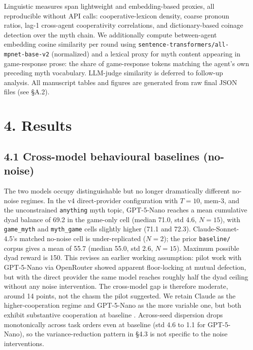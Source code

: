 \documentclass[10pt,letterpaper]{article}
\begin{document}
Linguistic measures span lightweight and embedding-based proxies, all
reproducible without API calls: cooperative-lexicon density, coarse
pronoun ratios, lag-1 cross-agent cooperativity correlations, and
dictionary-based coinage detection over the myth chain. We additionally
compute between-agent embedding cosine similarity per round using
\texttt{sentence-transformers/all-mpnet-base-v2} (normalized) and a
lexical proxy for myth content appearing in game-response prose: the
share of game-response tokens matching the agent's own preceding myth
vocabulary. LLM-judge similarity is deferred to follow-up analysis. All
manuscript tables and figures are generated from raw final JSON files
(see §A.2).

\section{4. Results}\label{results}

\subsection{4.1 Cross-model behavioural baselines
(no-noise)}\label{cross-model-behavioural-baselines-no-noise}

The two models occupy distinguishable but no longer dramatically
different no-noise regimes. In the v4 direct-provider configuration with
\(T = 10\), mem-3, and the unconstrained \texttt{anything} myth topic,
GPT-5-Nano reaches a mean cumulative dyad balance of 69.2 in the
game-only cell (median 71.0, std 4.6, \(N=15\)), with
\texttt{game\_myth} and \texttt{myth\_game} cells slightly higher (71.1
and 72.3). Claude-Sonnet-4.5's matched no-noise cell is under-replicated
(\(N = 2\)); the prior \texttt{baseline/} corpus gives a mean of 55.7
(median 55.0, std 2.6, \(N = 15\)). Maximum possible dyad reward is 150.
This revises an earlier working assumption: pilot work with GPT-5-Nano
via OpenRouter showed apparent floor-locking at mutual defection, but
with the direct provider the same model reaches roughly half the dyad
ceiling without any noise intervention. The cross-model gap is therefore
moderate, around 14 points, not the chasm the pilot suggested. We retain
Claude as the higher-cooperation regime and GPT-5-Nano as the more
variable one, but both exhibit substantive cooperation at baseline
\citep{serapio2023}. Across-seed dispersion drops
monotonically across task orders even at baseline (std 4.6 to 1.1 for
GPT-5-Nano), so the variance-reduction pattern in §4.3 is not specific
to the noise interventions.
\end{document}
